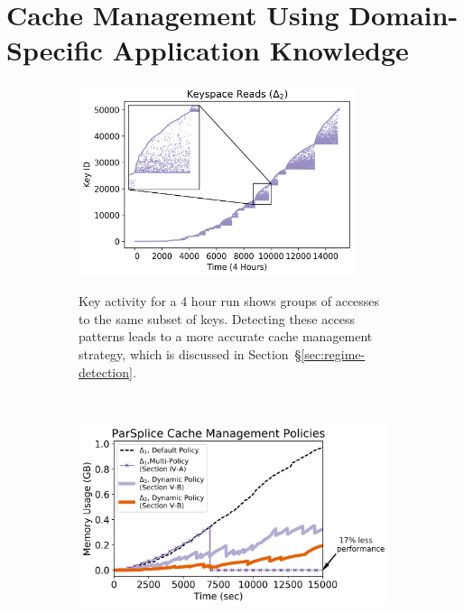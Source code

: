 \section{Cache Management Using Domain-Specific Application Knowledge}
\label{sec:dom-specific}

\begin{figure}[t!]
    \begin{subfigure}[t]{0.32\textwidth}
        \centering
	\includegraphics[width=0.89\textwidth]{figures/keyspace-zoomed.png}\\
\caption{Key activity for a 4 hour run shows groups of accesses to the same
subset of keys. Detecting these access patterns leads to a more accurate cache
management strategy, which is discussed in
Section~\S\ref{sec:regime-detection}.\label{fig:keyspace-zoomed}}
    \end{subfigure}%
    ~ 
    \begin{subfigure}[t]{0.32\textwidth}
        \centering
        \includegraphics[width=1\textwidth]{figures/memory-vs-time.png}\\

\end{subfigure}
\end{figure}
